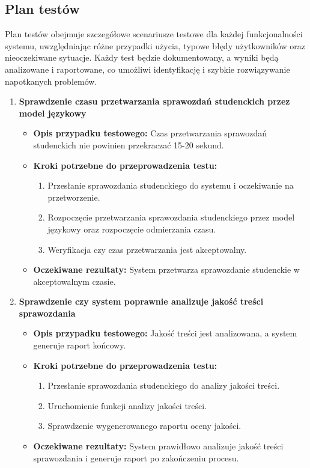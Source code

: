 \documentclass[a4paper, 12pt]{article}
\begin{document}
\subsection{Plan testów}

Plan testów obejmuje szczegółowe scenariusze testowe dla każdej funkcjonalności systemu, uwzględniając różne przypadki użycia, typowe błędy użytkowników oraz nieoczekiwane sytuacje. Każdy test będzie dokumentowany, a wyniki będą analizowane i raportowane, co umożliwi identyfikację i szybkie rozwiązywanie napotkanych problemów.

\begin{enumerate}
\item \textbf{Sprawdzenie czasu przetwarzania sprawozdań studenckich przez model językowy}
   \begin{itemize}
   \item \textbf{Opis przypadku testowego:} Czas przetwarzania sprawozdań studenckich nie powinien przekraczać 15-20 sekund.
   \item \textbf{Kroki potrzebne do przeprowadzenia testu:}
     \begin{enumerate}
     \item Przesłanie sprawozdania studenckiego do systemu i oczekiwanie na przetworzenie.
     \item Rozpoczęcie przetwarzania sprawozdania studenckiego przez model językowy oraz rozpoczęcie odmierzania czasu.
     \item Weryfikacja czy czas przetwarzania jest akceptowalny.
     \end{enumerate}
   \item \textbf{Oczekiwane rezultaty:} System przetwarza sprawozdanie studenckie w akceptowalnym czasie.
   \end{itemize}

\item \textbf{Sprawdzenie czy system poprawnie analizuje jakość treści sprawozdania}
   \begin{itemize}
   \item \textbf{Opis przypadku testowego:} Jakość treści jest analizowana, a system generuje raport końcowy.
   \item \textbf{Kroki potrzebne do przeprowadzenia testu:}
     \begin{enumerate}
     \item Przesłanie sprawozdania studenckiego do analizy jakości treści.
     \item Uruchomienie funkcji analizy jakości treści.
     \item Sprawdzenie wygenerowanego raportu oceny jakości.
     \end{enumerate}
   \item \textbf{Oczekiwane rezultaty:} System prawidłowo analizuje jakość treści sprawozdania i generuje raport po zakończeniu procesu.
   \end{itemize}


\end{enumerate}
\end{document}
